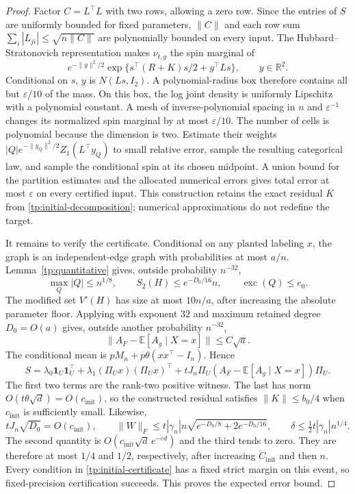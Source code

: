 \documentclass[11pt]{article}
\def\E{\mathbb{E}}
\def\R{\mathbb{R}}
\numberwithin{equation}{section}
\begin{document}
\begin{proof}
Factor $C=L^\top L$ with two rows, allowing a zero row. Since the entries of $S$ are uniformly bounded for fixed parameters, $\|C\|$ and each row sum $\sum_i|L_{ji}|\le\sqrt{n\|C\|}$ are polynomially bounded on every input. The Hubbard--Stratonovich representation \cite[Theorem~3.12]{LMRW24} makes $\nu_{t,g}$ the spin marginal of
\[
 e^{-\|y\|^2/2}\exp\{s^\top(R+K)s/2+y^\top Ls\},
 \qquad y\in\R^2.
\]
Conditional on $s$, $y$ is $N(Ls,I_2)$. A polynomial-radius box therefore contains all but $\varepsilon/10$ of the mass. On this box, the log joint density is uniformly Lipschitz with a polynomial constant. A mesh of inverse-polynomial spacing in $n$ and $\varepsilon^{-1}$ changes its normalized spin marginal by at most $\varepsilon/10$. The number of cells is polynomial because the dimension is two. Estimate their weights
$|Q|e^{-\|y_Q\|^2/2}Z_1(L^\top y_Q)$ to small relative error, sample the resulting categorical law, and sample the conditional spin at its chosen midpoint. A union bound for the partition estimates and the allocated numerical errors gives total error at most $\varepsilon$ on every certified input. This construction retains the exact residual $K$ from \eqref{tp:initial-decomposition}; numerical approximations do not redefine the target.

It remains to verify the certificate. Conditional on any planted labeling $x$, the graph is an independent-edge graph with probabilities at most $a/n$. Lemma~\ref{tp:quantitative} gives, outside probability $n^{-32}$,
\[
 \max_Q|Q|\le n^{1/8},\qquad S_2(H)\le e^{-D_0/16}n,
 \qquad \operatorname{exc}(Q)\le e_0.
\]
The modified set $V'(H)$ has size at most $10n/a$, after increasing the absolute parameter floor. Applying \cite[Theorem~2.1]{LLV17} with exponent $32$ and maximum retained degree $D_0=O(a)$ gives, outside another probability $n^{-32}$,
\[
 \|A_F-\E[A_g\mid X=x]\|\le C\sqrt a.
\]
The conditional mean is $pM_n+p\theta(xx^\top-I_n)$. Hence
\[
 S=\lambda_0\boldsymbol1_U\boldsymbol1_U^\top
    +\lambda_1(\Pi_Ux)(\Pi_Ux)^\top
    +tJ_n\Pi_U(A_F-\E[A_g\mid X=x])\Pi_U.
\]
The first two terms are the rank-two positive witness. The last has norm $O(t\theta\sqrt d)=O(c_{\mathrm{init}})$, so the constructed residual satisfies $\|K\|\le b_0/4$ when $c_{\mathrm{init}}$ is sufficiently small. Likewise,
\[
 tJ_n\sqrt{D_0}=O(c_{\mathrm{init}}),\qquad
 \|W\|_F\le t|\gamma_n|n
       \sqrt{e^{-D_0/8}+2e^{-D_0/16}},\qquad
 \delta\le\tfrac12t|\gamma_n|n^{1/4}.
\]
The second quantity is $O(c_{\mathrm{init}}\sqrt d\,e^{-c d})$ and the third tends to zero. They are therefore at most $1/4$ and $1/2$, respectively, after increasing $C_{\mathrm{init}}$ and then $n$. Every condition in \eqref{tp:initial-certificate} has a fixed strict margin on this event, so fixed-precision certification succeeds. This proves the expected error bound.


\end{proof}
\end{document}
